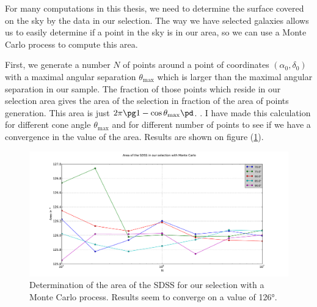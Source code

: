 For many computations in this thesis, we need to determine the surface covered on the sky by the data in our selection. The way
we have selected galaxies allows us to easily determine if a point in the sky is in our area, so we can use a Monte Carlo process
to compute this area.

First, we generate a number $N$ of points around a point of coordinates $(\alpha_0, \delta_0)$ with a maximal angular separation
$\theta_{\mathrm{max}}$ which is larger than the maximal angular separation in our sample. The fraction of those points which reside
in our selection area gives the area of the selection in fraction of the area of points generation. This area is just
$2\pi\pg1-\cos\theta_{\mathrm{max}}\pd$. . I have made
this calculation for different cone angle $\theta_{\mathrm{max}}$ and for different number of points to see if we have a convergence
in the value of the area. Results are shown on figure (\ref{fig:sdss_area}).
\begin{figure}[htb]
	\centering
	\includegraphics[width=\linewidth]{SDSS_area}
	\caption{\footnotesize{}Determination of the area of the SDSS for our selection with a Monte Carlo process. Results seem
	to converge on a value of \num{126}°.}
	\label{fig:sdss_area}
\end{figure}

